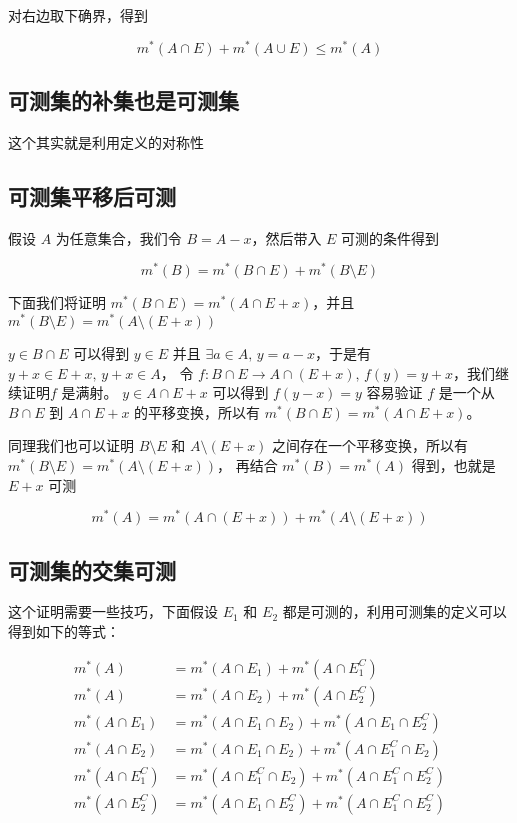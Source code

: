 对右边取下确界，得到 

\[
m^*(A\cap E) + m^*(A \cup E) \le m^*(A)
\]

\subsection{可测集的补集也是可测集}

这个其实就是利用定义的对称性

\subsection{可测集平移后可测}

假设 $A $ 为任意集合，我们令 $B = A - x$，然后带入 $E$ 可测的条件得到

\[
m^*(B) = m^*(B \cap E) + m^*(B \setminus E)
\]

下面我们将证明 $m^*(B \cap E) = m^*(A \cap E+x)$，并且 $m^*(B \setminus E) = m^*(A \setminus (E + x))$

$y \in B \cap E$ 可以得到 $y \in E$ 并且 $\exists a \in A,\, y = a - x$，于是有 $y + x \in E + x,\, y+x \in A$，
令 $f: B \cap E \to A \cap (E + x),\, f(y) = y + x$，我们继续证明$f$ 是满射。
$y \in A \cap E +x$ 可以得到 $f(y - x) = y $ 容易验证 $f$ 是一个从$B \cap E$ 到 $A \cap E + x$ 的平移变换，所以有 $m^*(B \cap E) = m^*(A \cap E+x)$。

同理我们也可以证明 $B \setminus E$ 和 $A \setminus (E + x)$ 之间存在一个平移变换，所以有 $m^*(B \setminus E) = m^*(A \setminus (E + x))$，
再结合 $m^*(B) = m^*(A)$ 得到，也就是 $E + x$ 可测


\[
m^*(A) = m^*(A \cap (E+x)) + m^*(A \setminus (E + x))
\]

\subsection{可测集的交集可测}

这个证明需要一些技巧，下面假设 $E_1$ 和 $E_2$ 都是可测的，利用可测集的定义可以得到如下的等式：

\begin{align*}
    m^*(A) & = m^*(A \cap E_1) + m^*(A \cap E_1^C) \\ 
    m^*(A) & = m^*(A \cap E_2) + m^*(A \cap E_2^C) \\ 
    m^*(A \cap E_1) & = m^*(A \cap E_1 \cap E_2) + m^*(A \cap E_1 \cap E_2^{C}) \\ 
    m^*(A \cap E_2) & = m^*(A \cap E_1 \cap E_2) + m^*(A \cap E_1^{C} \cap E_2) \\ 
    m^*(A \cap E_1^C) & = m^*(A \cap E_1^C \cap E_2) + m^*(A \cap E_1^C \cap E_2^{C}) \\ 
    m^*(A \cap E_2^C) & = m^*(A \cap E_1 \cap E_2^C) + m^*(A \cap E_1^{C} \cap E_2^C) \\ 
\end{align*}

